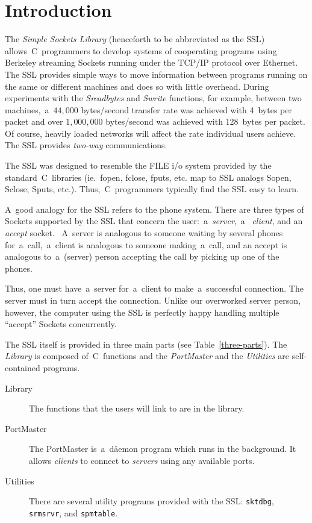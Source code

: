\documentclass[12pt]{article}
\def\SSL{{\small SSL}}
\def\TCP{{\small TCP/IP }}
\begin{document}
\section{Introduction}

The {\em Simple Sockets Library} (henceforth to be abbreviated as the \SSL)
allows~C~programmers to develop systems of cooperating programs using Berkeley
streaming Sockets running under the {\TCP} protocol over Ethernet.  The
{\SSL} provides simple ways to move information between programs running on the
same or different machines and does so with little overhead.  During
experiments with the {\em Sreadbytes} and {\em Swrite} functions, for example,
between two machines,~a~$44,000$ bytes/second transfer rate was achieved with
4~bytes per packet and over $1,000,000$ bytes/second was achieved with
128~bytes per packet.  Of course, heavily loaded networks will affect the rate
individual users achieve.  The {\SSL} provides {\em two-way} communications.

The {\SSL} was designed to resemble the {\small FILE} i/o system provided
by the standard~C~libraries (ie.~fopen, fclose, fputs, etc. map to
{\SSL} analogs Sopen, Sclose, Sputs, etc.).  Thus,~C~programmers typically
find the {\SSL} easy to learn.

A~good analogy for the {\SSL} refers to the phone system.  There are three types
of Sockets supported by the {\SSL} that concern the user:~a~{\em server},~a~{\em
client}, and an {\em accept} socket. ~A~server is analogous to someone waiting
by several phones for~a~call,~a~client is analogous to someone making~a~call,
and an accept is analogous to~a~(server) person accepting the call by picking
up one of the phones.

Thus, one must have~a~server for~a~client to make~a~successful connection.  The
server must in turn accept the connection.  Unlike our overworked server
person, however, the computer using the {\SSL} is perfectly happy handling
multiple ``accept'' Sockets concurrently.

The {\SSL} itself is provided in three main parts (see Table~\ref{three-parts}).
The {\em Library} is composed of~C~functions and the {\em PortMaster} and the
{\em Utilities} are self-contained programs.

\begin{table}[ht]
  \caption{\bf The Three Parts of the \SSL}
  \label{three-parts}
  \begin{description}

  \item[Library] The functions that the users will link to are in the
    library.

  \item[PortMaster] The PortMaster is~a~d\"aemon program which runs in
    the background.  It allows {\em clients} to connect to {\em servers}
    using any available ports.

  \item[Utilities] There are several utility programs provided with
    the \SSL: {\tt sktdbg}, {\tt srmsrvr}, and {\tt spmtable}.
  \end{description}
\end{table}
\end{document}
